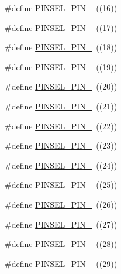 \begin{DoxyCompactItemize}
\item 
\#define \hyperlink{group___p_i_n_s_e_l___public___macros_ga7f7070e9cf520a08cbdd2daa09e90022}{P\+I\+N\+S\+E\+L\+\_\+\+P\+I\+N\+\_}~((16))
\item 
\#define \hyperlink{group___p_i_n_s_e_l___public___macros_ga1b43687db040e5b4d7e4d6ba6cac0e83}{P\+I\+N\+S\+E\+L\+\_\+\+P\+I\+N\+\_}~((17))
\item 
\#define \hyperlink{group___p_i_n_s_e_l___public___macros_ga6203e5b5f1e3a49fa2fc1ca61f6fde52}{P\+I\+N\+S\+E\+L\+\_\+\+P\+I\+N\+\_}~((18))
\item 
\#define \hyperlink{group___p_i_n_s_e_l___public___macros_ga2b68a8639e7133664f1ebf2ef222eca0}{P\+I\+N\+S\+E\+L\+\_\+\+P\+I\+N\+\_}~((19))
\item 
\#define \hyperlink{group___p_i_n_s_e_l___public___macros_gaf6f10e74df1a1bbcb6ef73ba610cc129}{P\+I\+N\+S\+E\+L\+\_\+\+P\+I\+N\+\_}~((20))
\item 
\#define \hyperlink{group___p_i_n_s_e_l___public___macros_ga1708e4ff4379303c85280efcbcfeeacf}{P\+I\+N\+S\+E\+L\+\_\+\+P\+I\+N\+\_}~((21))
\item 
\#define \hyperlink{group___p_i_n_s_e_l___public___macros_ga27e3f393b4659a93c8f4d3b3b3a07895}{P\+I\+N\+S\+E\+L\+\_\+\+P\+I\+N\+\_}~((22))
\item 
\#define \hyperlink{group___p_i_n_s_e_l___public___macros_ga0bf6017400b515d5384cc6c9b2616dfb}{P\+I\+N\+S\+E\+L\+\_\+\+P\+I\+N\+\_}~((23))
\item 
\#define \hyperlink{group___p_i_n_s_e_l___public___macros_ga59268564226c0dec33b412a4cd60652e}{P\+I\+N\+S\+E\+L\+\_\+\+P\+I\+N\+\_}~((24))
\item 
\#define \hyperlink{group___p_i_n_s_e_l___public___macros_ga7c717ad27b00320f904d2b43044ba715}{P\+I\+N\+S\+E\+L\+\_\+\+P\+I\+N\+\_}~((25))
\item 
\#define \hyperlink{group___p_i_n_s_e_l___public___macros_ga34dc530d30abfe96758b94606849361f}{P\+I\+N\+S\+E\+L\+\_\+\+P\+I\+N\+\_}~((26))
\item 
\#define \hyperlink{group___p_i_n_s_e_l___public___macros_gaed7e80ef29cd5027ef7794d78861dc12}{P\+I\+N\+S\+E\+L\+\_\+\+P\+I\+N\+\_}~((27))
\item 
\#define \hyperlink{group___p_i_n_s_e_l___public___macros_gaa2f94e6ccf0aafdc16627745d98678e3}{P\+I\+N\+S\+E\+L\+\_\+\+P\+I\+N\+\_}~((28))
\item 
\#define \hyperlink{group___p_i_n_s_e_l___public___macros_gae2117d5933ea9ffd03005dcedaa8ffcd}{P\+I\+N\+S\+E\+L\+\_\+\+P\+I\+N\+\_}~((29))

\end{DoxyCompactItemize}

